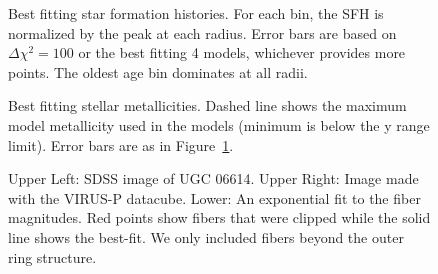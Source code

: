 \documentclass{emulateapj}
\begin{document}


\begin{figure}
\caption{ Best fitting star formation histories.  For each bin, the SFH is normalized by the peak at each radius.  Error bars are based on $\Delta\chi^2=100$ or the best fitting 4 models, whichever provides more points.  The oldest age bin dominates at all radii.  \label{sfh_malin2} }
\end{figure}


\begin{figure}
\caption{Best fitting stellar metallicities.   Dashed line shows the maximum model metallicity used in the models (minimum is below the y range limit).  Error bars are as in Figure~\ref{sfh_malin2}.  \label{metal_malin2}}
\end{figure}


\begin{figure}
\caption{Upper Left:  SDSS image of UGC 06614.  Upper Right:  Image made with the VIRUS-P datacube.  Lower:  An exponential fit to the fiber magnitudes.  Red points show fibers that were clipped while the solid line shows the best-fit.  We only included fibers beyond the outer ring structure.  \label{ugc_fibers} }
\end{figure}


\end{document}
